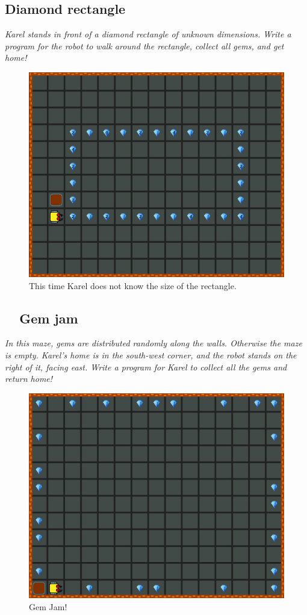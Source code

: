 {{\subsection{Diamond rectangle}

{\em Karel stands in front of a diamond rectangle of unknown dimensions. Write a program for the robot to walk around the rectangle, collect all gems, and get home!}


\begin{figure}[!ht]
\begin{center}
\includegraphics[height=0.4\textwidth]{img/f09.png}
\end{center}
\vspace{-4mm}
\caption{This time Karel does not know the size of the rectangle.}
\label{fig:f09}
\end{figure}
\vspace{-1cm}



\subsection{\ \ Gem jam}

{\em In this maze, gems are distributed randomly along the walls. Otherwise 
the maze is empty. Karel's home is in the south-west corner, and the robot 
stands on the right of it, facing east. Write a program for Karel to collect 
all the gems and return home!}

\begin{figure}[!ht]
\begin{center}
\includegraphics[height=0.4\textwidth]{img/f10.png}
\end{center}
\vspace{-4mm}
\caption{Gem Jam!}
\label{fig:f10}
\vspace{-1cm}
\end{figure}
\newpage


}}
